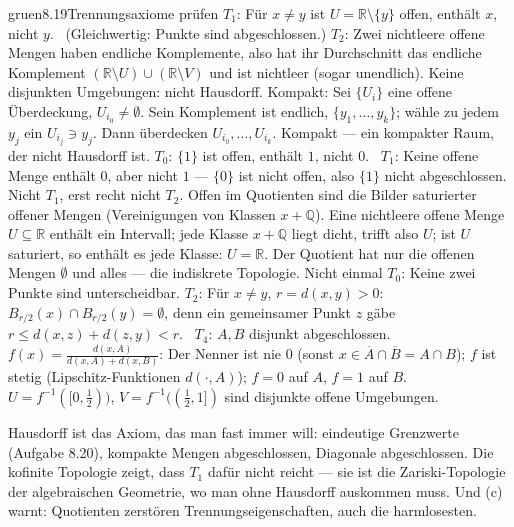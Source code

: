 \begin{loesungkarte}{gruen}{8.19}{Trennungsaxiome prüfen}
$T_1$: Für $x\neq y$ ist $U = \mathbb R\setminus\{y\}$ offen, enthält $x$, nicht $y$. \checkmark\ (Gleichwertig: Punkte sind abgeschlossen.) $T_2$: Zwei nichtleere offene Mengen haben endliche Komplemente, also hat ihr Durchschnitt das endliche Komplement $(\mathbb R\setminus U)\cup(\mathbb R\setminus V)$ und ist nichtleer (sogar unendlich). Keine disjunkten Umgebungen: nicht Hausdorff. Kompakt: Sei $\{U_i\}$ eine offene Überdeckung, $U_{i_0}\neq\emptyset$. Sein Komplement ist endlich, $\{y_1, \dots, y_k\}$; wähle zu jedem $y_j$ ein $U_{i_j}\ni y_j$. Dann überdecken $U_{i_0}, \dots, U_{i_k}$. Kompakt --- ein kompakter Raum, der nicht Hausdorff ist. \checkmark
{}
$T_0$: $\{1\}$ ist offen, enthält $1$, nicht $0$. \checkmark\ $T_1$: Keine offene Menge enthält $0$, aber nicht $1$ --- $\{0\}$ ist nicht offen, also $\{1\}$ nicht abgeschlossen. Nicht $T_1$, erst recht nicht $T_2$.
Offen im Quotienten sind die Bilder saturierter offener Mengen (Vereinigungen von Klassen $x + \mathbb Q$). Eine nichtleere offene Menge $U\subseteq\mathbb R$ enthält ein Intervall; jede Klasse $x + \mathbb Q$ liegt dicht, trifft also $U$; ist $U$ saturiert, so enthält es jede Klasse: $U = \mathbb R$. Der Quotient hat nur die offenen Mengen $\emptyset$ und alles --- die indiskrete Topologie. Nicht einmal $T_0$: Keine zwei Punkte sind unterscheidbar.
$T_2$: Für $x\neq y$, $r = d(x, y) > 0$: $B_{r/2}(x)\cap B_{r/2}(y) = \emptyset$, denn ein gemeinsamer Punkt $z$ gäbe $r\le d(x, z) + d(z, y) < r$. \checkmark\ $T_4$: $A, B$ disjunkt abgeschlossen. $f(x) = \frac{d(x, A)}{d(x, A) + d(x, B)}$: Der Nenner ist nie $0$ (sonst $x\in\overline A\cap\overline B = A\cap B$); $f$ ist stetig (Lipschitz-Funktionen $d(\cdot, A)$); $f = 0$ auf $A$, $f = 1$ auf $B$. $U = f^{-1}([0, \frac12))$, $V = f^{-1}((\frac12, 1])$ sind disjunkte offene Umgebungen. \checkmark
{}
\begin{mitnehmen}\kastentext
Hausdorff ist das Axiom, das man fast immer will: eindeutige Grenzwerte (Aufgabe 8.20), kompakte Mengen abgeschlossen, Diagonale abgeschlossen. Die kofinite Topologie zeigt, dass $T_1$ dafür nicht reicht --- sie ist die Zariski-Topologie der algebraischen Geometrie, wo man ohne Hausdorff auskommen muss. Und (c) warnt: Quotienten zerstören Trennungseigenschaften, auch die harmlosesten.
\end{mitnehmen}
\end{loesungkarte}

